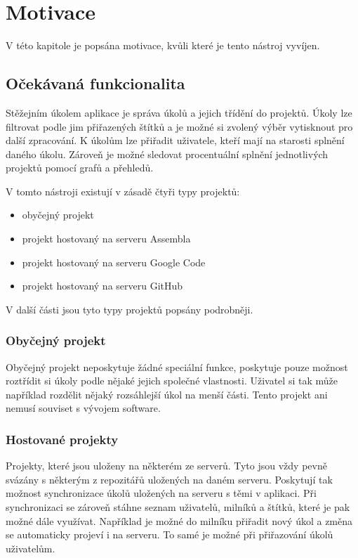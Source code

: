 \chapter{Motivace}

V této kapitole je popsána motivace, kvůli které je tento nástroj vyvíjen.

\section{Očekávaná funkcionalita}

Stěžejním úkolem aplikace je správa úkolů a jejich třídění do projektů. Úkoly lze filtrovat podle jim přiřazených štítků a je možné si zvolený výběr vytisknout pro další zpracování. K úkolům lze přiřadit uživatele, kteří mají na starosti splnění daného úkolu. Zároveň je možné sledovat procentuální splnění jednotlivých projektů pomocí grafů a přehledů.

V tomto nástroji existují v zásadě čtyři typy projektů:

\begin{itemize}
\item obyčejný projekt
\item projekt hostovaný na serveru Assembla
\item projekt hostovaný na serveru Google Code
\item projekt hostovaný na serveru GitHub
\end{itemize}

V další části jsou tyto typy projektů popsány podrobněji.

\subsection{Obyčejný projekt}

Obyčejný projekt neposkytuje žádné speciální funkce, poskytuje pouze možnost roztřídit si úkoly podle nějaké jejich společné vlastnosti. Uživatel si tak může například rozdělit nějaký rozsáhlejší úkol na menší části. Tento projekt ani nemusí souviset s vývojem software.

\subsection{Hostované projekty}

Projekty, které jsou uloženy na některém ze serverů. Tyto jsou vždy pevně svázány s některým z repozitářů uložených na daném serveru. Poskytují tak možnost synchronizace úkolů uložených na serveru s těmi v aplikaci. Při synchronizaci se zároveň stáhne seznam uživatelů, milníků a štítků, které je pak možné dále využívat. Například je možné do milníku přiřadit nový úkol a změna se automaticky projeví i na serveru. To samé je možné při přiřazování úkolů uživatelům.

